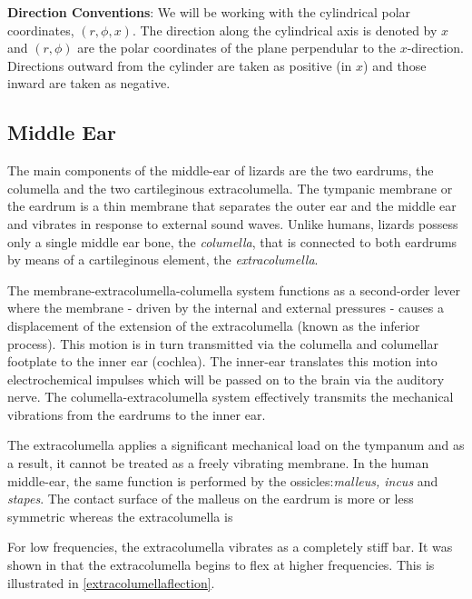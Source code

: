 \vspace{\baselineskip}
\noindent\textbf{Direction Conventions}: We will be working with the cylindrical polar coordinates, $(r,\phi,x)$. The direction
along the cylindrical axis is denoted by $x$ and $(r,\phi)$ are the polar coordinates of the plane perpendular to the $x$-direction. 
Directions outward from the cylinder are taken as positive (in $x$) and those inward are taken as negative.
\subsection{Middle Ear}\label{middleear}
The main components of the middle-ear of lizards are the two eardrums, the columella and the two cartileginous extracolumella.  
The tympanic membrane or the eardrum is a thin membrane that separates the outer ear and the
middle ear and vibrates in response to external sound waves.  Unlike humans, lizards 
possess only a single middle ear bone, the \textit{columella},
that is connected to both eardrums by means of a cartileginous element, the \textit{extracolumella}.

The membrane-extracolumella-columella system functions
as a second-order lever where the membrane - driven by the internal and external pressures - causes a displacement
of the extension of the extracolumella (known as the inferior process). This motion is in turn transmitted 
via the columella and columellar footplate to the inner ear (cochlea). The inner-ear translates this motion into
electrochemical impulses which will be passed on to the brain via the auditory nerve. The columella-extracolumella system effectively
transmits the mechanical vibrations from the eardrums to the inner ear. 

The extracolumella applies a significant mechanical load on the tympanum and as a result, 
it cannot be treated as a freely vibrating membrane. In the human middle-ear, the same function is
performed by the ossicles:\textit{malleus, incus} and \textit{stapes}. The contact surface of the malleus
on the eardrum is more or less symmetric whereas the extracolumella is 

For low frequencies, the extracolumella 
vibrates as a completely stiff bar. It was shown in \cite{manleygecko2} that the extracolumella begins to flex at higher frequencies. 
This is illustrated in \ref{extracolumellaflection}.

